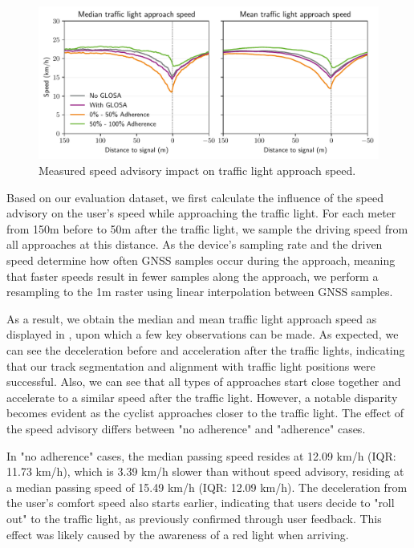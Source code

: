 \begin{figure}[t]
\caption{Measured speed advisory impact on traffic light approach speed.}\label{fig:impacts-approach-speed}
\includegraphics[width=\linewidth]{images/impacts-approach-speed.pdf}
\end{figure}

Based on our evaluation dataset, we first calculate the influence of the speed advisory on the user's speed while approaching the traffic light. For each meter from 150m before to 50m after the traffic light, we sample the driving speed from all approaches at this distance. As the device's sampling rate and the driven speed determine how often GNSS samples occur during the approach, meaning that faster speeds result in fewer samples along the approach, we perform a resampling to the 1m raster using linear interpolation between GNSS samples.

As a result, we obtain the median and mean traffic light approach speed as displayed in , upon which a few key observations can be made. As expected, we can see the deceleration before and acceleration after the traffic lights, indicating that our track segmentation and alignment with traffic light positions were successful. Also, we can see that all types of approaches start close together and accelerate to a similar speed after the traffic light. However, a notable disparity becomes evident as the cyclist approaches closer to the traffic light. The effect of the speed advisory differs between "no adherence" and "adherence" cases.

In "no adherence" cases, the median passing speed resides at 12.09 km/h (IQR: 11.73 km/h), which is 3.39 km/h slower than without speed advisory, residing at a median passing speed of 15.49 km/h (IQR: 12.09 km/h). The deceleration from the user's comfort speed also starts earlier, indicating that users decide to "roll out" to the traffic light, as previously confirmed through user feedback. This effect was likely caused by the awareness of a red light when arriving.

